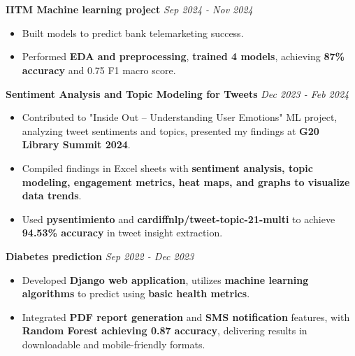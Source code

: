 \documentclass[a4paper,10pt]{article}
\begin{document}
\section{\scshape\color{Fuchsia}{\faLaptopCode\ \textbf PROJECTS}}
\textbf{IITM Machine learning project} \href{https://github.com/ShreehariA/IITM_MLP_Project}{} \hfill \textit{Sep 2024 - Nov 2024}
\vspace{-2mm}
\begin{itemize}
    \item Built models to predict bank telemarketing success.
    \vspace{-2mm}
    \item Performed \textbf{EDA and preprocessing}, \textbf{trained 4 models}, achieving \textbf{87\% accuracy} and 0.75 F1 macro score.
\end{itemize}
\textbf{Sentiment Analysis and Topic Modeling for Tweets} \href{https://github.com/ShreehariA/G20_Library_Summit}{} \hfill \textit{Dec 2023 - Feb 2024}
\vspace{-2mm}
\begin{itemize}
    \item Contributed to "Inside Out – Understanding User Emotions" ML project, analyzing tweet sentiments and topics, presented my findings at \textbf{G20 Library Summit 2024}.
    \vspace{-2mm}
    \item Compiled findings in Excel sheets with \textbf{sentiment analysis, topic modeling, engagement metrics, heat maps, and graphs to visualize data trends}.
    \vspace{-2mm}
    \item Used \textbf{pysentimiento} and \textbf{cardiffnlp/tweet-topic-21-multi} to achieve \textbf{94.53\% accuracy} in tweet insight extraction.
\end{itemize}
\textbf{Diabetes prediction} \href{https://github.com/ShreehariA/diabetes-pred}{} \hfill \textit{Sep 2022 - Dec 2023}
\vspace{-2mm}
\begin{itemize}
    \item Developed \textbf{Django web application}, utilizes \textbf{machine learning algorithms} to predict using \textbf{basic health metrics}.
    \vspace{-2mm}
    \item Integrated \textbf{PDF report generation} and \textbf{SMS notification} features, with \textbf{Random Forest achieving 0.87 accuracy}, delivering results in downloadable and mobile-friendly formats.
\end{itemize}
\end{document}
